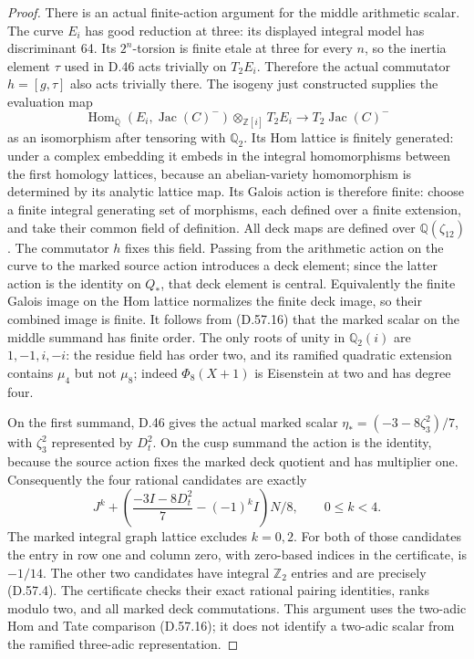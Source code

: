 \begin{proof}
There is an actual finite-action argument for the middle
arithmetic scalar. The curve \(E_i\) has good reduction at
three: its displayed integral model has discriminant 64.
Its \(2^n\)-torsion is finite etale at three for every \(n\),
so the inertia element \(\tau\) used in D.46 acts trivially
on \(T_2E_i\). Therefore the actual commutator
\(h=[g,\tau]\) also acts trivially there. The isogeny just
constructed supplies the evaluation map
\[
 \operatorname{Hom}_{\overline{\mathbb Q}}
       (E_i,\operatorname{Jac}(C)^-)
       \otimes_{\mathbb Z[i]}T_2E_i
       \longrightarrow T_2\operatorname{Jac}(C)^-
 \tag{D.57.16}
\]
as an isomorphism after tensoring with \(\mathbb Q_2\).
Its Hom lattice is finitely generated: under a complex
embedding it embeds in the integral homomorphisms between
the first homology lattices, because an abelian-variety
homomorphism is determined by its analytic lattice map.
Its Galois action is therefore finite: choose a finite
integral generating set of morphisms, each defined over a
finite extension, and take their common field of definition.
All deck maps are defined over \(\mathbb Q(\zeta_{12})\).
The commutator \(h\) fixes this field. Passing from the
arithmetic action on the curve to the marked source action
introduces a deck element; since the latter action is the
identity on \(Q_*\), that deck element is central.
Equivalently the finite Galois image on the Hom lattice
normalizes the finite deck image, so their combined image
is finite. It follows from (D.57.16) that the marked scalar
on the middle summand has finite order. The only roots of
unity in \(\mathbb Q_2(i)\) are \(1,-1,i,-i\): the
residue field has order two, and its ramified quadratic
extension contains \(\mu_4\) but not \(\mu_8\);
indeed \(\Phi_8(X+1)\) is Eisenstein at two and has degree four.

On the first summand, D.46 gives the actual marked scalar
\(\eta_*=(-3-8\zeta_3^2)/7\), with \(\zeta_3^2\)
represented by \(D_t^2\). On the cusp summand the action
is the identity, because the source action fixes the
marked deck quotient and has multiplier one. Consequently
the four rational candidates are exactly
\[
 J^k+\left(\frac{-3I-8D_t^2}{7}-(-1)^kI\right)N/8,
       \qquad 0\leq k<4.
 \tag{D.57.17}
\]
The marked integral graph lattice excludes \(k=0,2\).
For both of those candidates the entry in row one and
column zero, with zero-based indices in the certificate,
is \(-1/14\). The other two candidates have integral
\(\mathbb Z_2\) entries and are precisely (D.57.4).
The certificate checks their exact rational pairing
identities, ranks modulo two, and all marked deck
commutations. This argument uses the two-adic Hom and Tate
comparison (D.57.16); it does not identify a two-adic scalar
from the ramified three-adic representation.


\end{proof}
